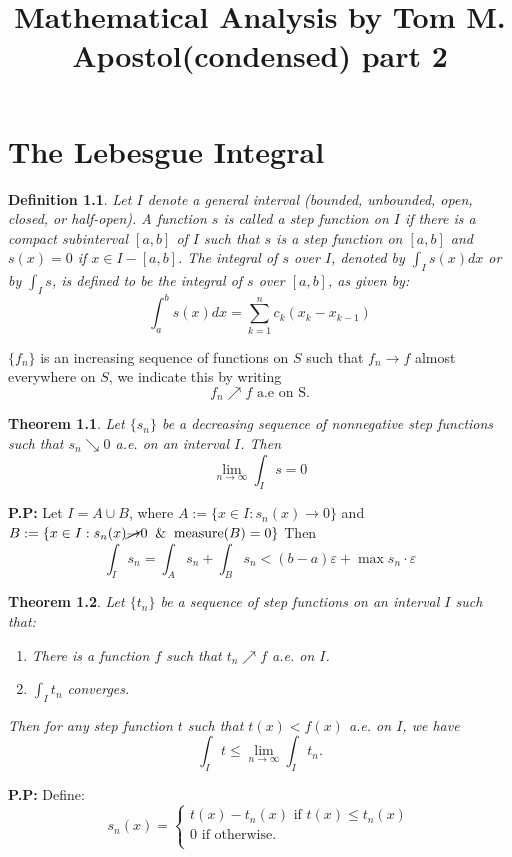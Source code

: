 \documentclass[10pt,a4paper]{book}
\begin{document}
	
	\renewcommand{\familydefault}{ptm}
	\title{Mathematical Analysis by Tom M. Apostol(condensed) part 2}
	\maketitle
\renewcommand{\PP}{\noindent \textbf{P.P: }}	
	\newtheorem{Thm}{Theorem}
		\newtheorem{deff}{Definition}
		\renewcommand{\R}{\mathbb{R}}

\chapter{The Lebesgue Integral}
\begin{deff}
Let $I$ denote a general interval (bounded, unbounded, open, closed,
or half-open). A function $s$ is called a step function on $I$ if there is a compact subinterval $[a, b]$ of $I$ such that $s$ is a step function on $[a, b]$ and $s(x) = 0$ if $x \in  I - [a, b]$. The integral of $s$ over $I$, denoted by $\int_I s(x) dx$ or by $\int_I s$, is defined
to be the integral of $s$ over $[a, b]$, as given by:
$$\int_a^b s(x) dx =  \sum_{k=1}^n c_k(x_k - x_{k-1})$$


\end{deff}
\noindent $\{f_n\}$ is an increasing sequence of functions on $S$ such that $f_n \to f$
almost everywhere on $S$, we indicate this by writing
$$f_n \nearrow f \text{  a.e on S.}$$
\begin{Thm}
Let $\{s_n\}$ be a decreasing sequence of nonnegative step functions such
that $s_n \searrow 0$  a.e. on an interval $I$. Then
$$\lim_{n \to \infty} \int_I s = 0$$ 
\end{Thm}

\PP Let $I = A \cup B$, where    $A:=\{x\in I: s_n(x) \to 0\}$ and $B := \{x\in I: s_n(x) \cancel{\to} 0 \And \text{measure}(B) = 0 \}$ Then
$$\int_I s_n = \int_A s_n + \int_B s_n  < (b-a)\varepsilon + \max s_n \cdot \varepsilon$$
\begin{Thm}
Let $\{t_n\}$ be a sequence of step functions on an interval $I$ such that:
\begin{enumerate}

    \item There is a function $f$ such that $t_n \nearrow  f$ a.e. on $I$.
    \item $\int_I t_n$ converges.
\end{enumerate}
Then for any step function $t$ such that $t(x) < f(x)$ a.e. on $I$, we have
$$\int_I t \leq \lim_{n \to \infty }\int_I t_n.$$
\end{Thm}
\PP Define:
$$s_n(x) =
\begin{cases}
t(x) - t_n(x) \text{ if } t(x) \leq t_n(x)\\
0 \text{ if otherwise.}\\ 
\end{cases}
$$
\end{document}
